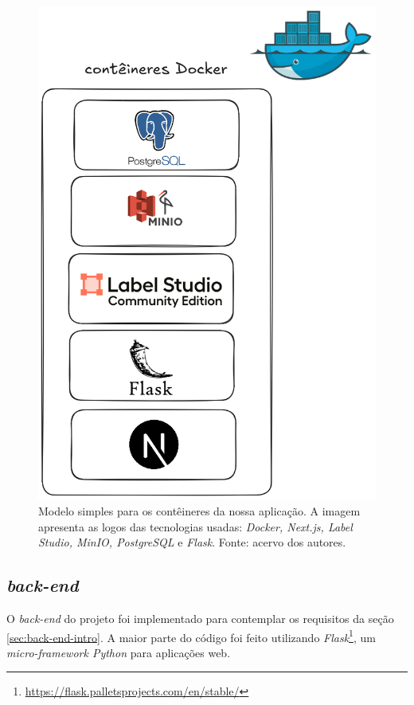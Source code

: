 \begin{figure}[htbp]
    \centering
    \includegraphics[height=0.5\textheight]{images/containers.png}
    \caption{\label{fig:containers} Modelo simples para os contêineres da nossa aplicação. A imagem apresenta as logos das tecnologias usadas: \emph{Docker, Next.js, Label Studio, MinIO, PostgreSQL} e \emph{Flask}. Fonte: acervo dos autores.}
\end{figure}

\subsection{\emph{back-end}}
O \emph{back-end} do projeto foi implementado para contemplar os requisitos da seção \ref{sec:back-end-intro}. A maior parte do código foi feito utilizando \emph{Flask}\footnote{\url{https://flask.palletsprojects.com/en/stable/}}, um \emph{micro-framework Python} para aplicações web.

